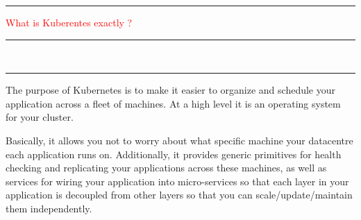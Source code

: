 \documentclass{article}
\begin{document}
\noindent
{\color{red} \rule{\linewidth}{0.5mm}}
\textcolor{red}{What is Kuberentes exactly ?} \\
\noindent
{\color{red} \rule{\linewidth}{0.5mm}}
 \\
 {\color{red} \rule{\linewidth}{0.5mm}}
\begin{tcolorbox}[colback=red!5!white, colframe=red!50!black,title=Kubernetes]
    The purpose of Kubernetes is to make it easier to organize and schedule your application across a fleet of machines. At a high level it is an operating system for your cluster. \\
\end{tcolorbox}
Basically, it allows you not to worry about what specific machine your datacentre each application runs on. Additionally, it provides generic primitives for health checking and replicating your applications across these machines, as well as services for wiring your application into micro-services so that each layer in your application is decoupled from other layers so that you can scale/update/maintain them independently. \\
\newpage
\end{document}
